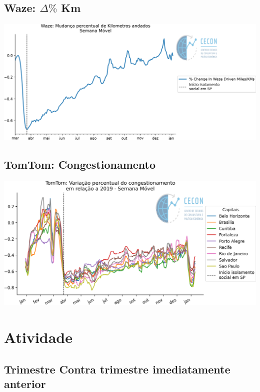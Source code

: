 \documentclass{SelfArx}
\begin{document}
\subsection*{Waze: \(\Delta \%\) Km}
\label{sec:org0e3e2d8}

\begin{center}
\includegraphics[width=.9\linewidth]{./figs/Granulares/Waze_Brasil.png}
\end{center}

\subsection*{TomTom: Congestionamento}
\label{sec:org4594f2c}

\begin{center}
\includegraphics[width=.9\linewidth]{./figs/Granulares/TomTom_Brasil.png}
\end{center}

\section*{Atividade}
\label{sec:org47f64cb}



\subsection*{Trimestre Contra trimestre imediatamente anterior}
\label{sec:org85f9fea}
\end{document}
